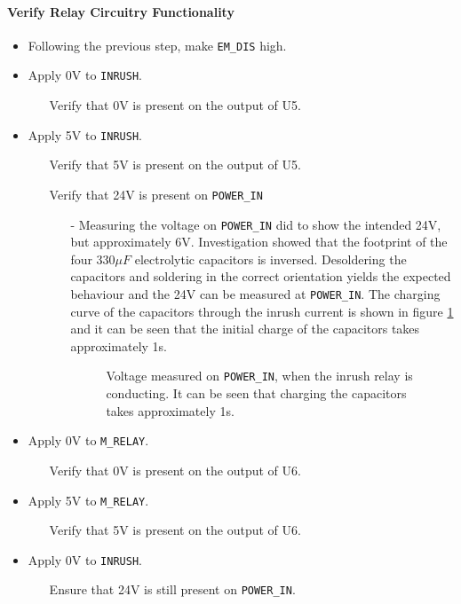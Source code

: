 \paragraph{Verify Relay Circuitry Functionality} %
\label{par:verify_relay_circuitry}
\begin{itemize}
	\item Following the previous step, make \texttt{EM\_DIS} high.
	\item Apply 0V to \texttt{INRUSH}.
	\begin{itemize}
		\item[\cmark] Verify that 0V is present on the output of U5.
	\end{itemize}
	\item Apply 5V to \texttt{INRUSH}.
	\begin{itemize}
		\item[\cmark] Verify that 5V is present on the output of U5.
		\item[\xmark] Verify that 24V is present on \texttt{POWER\_IN}
		\begin{itemize}
			\item[-]  Measuring the voltage on \texttt{POWER\_IN} did to show the intended 24V, but approximately 6V. 
			Investigation showed that the footprint of the four $330 \mu F$ electrolytic capacitors is inversed. 
			Desoldering the capacitors and soldering in the correct orientation yields the expected behaviour and the 24V can be measured at \texttt{POWER\_IN}.
			The charging curve of the capacitors through the inrush current is shown in figure 
			\ref{fig:controllerboardv2_inrushcurrent_charge} and it can be seen that the initial charge of the capacitors takes approximately 1s. 

			\begin{figure}[h]
				\centering
			    
				\caption[Chargin curve of Capacitor bank.]{Voltage measured on \texttt{POWER\_IN}, when the inrush relay is conducting. It can be seen that charging the capacitors takes approximately 1s. }
				\label{fig:controllerboardv2_inrushcurrent_charge}
			\end{figure}
 
		\end{itemize}
	\end{itemize}
	\item Apply 0V to \texttt{M\_RELAY}.
	\begin{itemize}
		\item[\cmark] Verify that 0V is present on the output of U6.
	\end{itemize}
	\item Apply 5V to \texttt{M\_RELAY}.
	\begin{itemize}
		\item[\cmark] Verify that 5V is present on the output of U6.
	\end{itemize}
	\item Apply 0V to \texttt{INRUSH}.
	\begin{itemize}
		\item[\cmark] Ensure that 24V is still present on \texttt{POWER\_IN}.
	\end{itemize}
\end{itemize}
